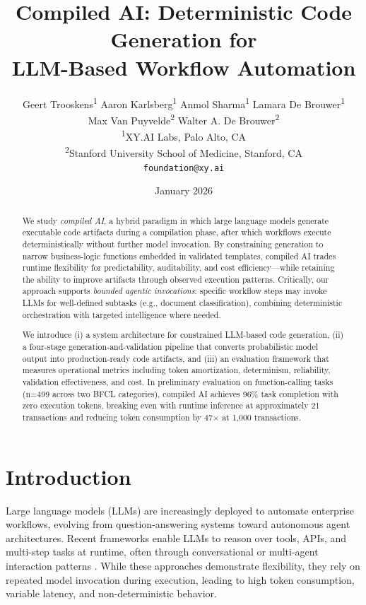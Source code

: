 \documentclass[11pt]{article}
\title{Compiled AI: Deterministic Code Generation for\\LLM-Based Workflow Automation}
\author{
  Geert Trooskens\textsuperscript{1} \quad
  Aaron Karlsberg\textsuperscript{1} \quad
  Anmol Sharma\textsuperscript{1} \quad
  Lamara De Brouwer\textsuperscript{1} \\[0.3em]
  Max Van Puyvelde\textsuperscript{2} \quad
  Walter A. De Brouwer\textsuperscript{2}
  \\[1em]
  \textsuperscript{1}XY.AI Labs, Palo Alto, CA \\
  \textsuperscript{2}Stanford University School of Medicine, Stanford, CA \\[0.5em]
  \texttt{foundation@xy.ai}
}
\date{January 2026}
\begin{document}
\maketitle

\begin{abstract}

We study \emph{compiled AI}, a hybrid paradigm in which large language models generate executable code artifacts during a compilation phase, after which workflows execute deterministically without further model invocation. By constraining generation to narrow business-logic functions embedded in validated templates, compiled AI trades runtime flexibility for predictability, auditability, and cost efficiency---while retaining the ability to improve artifacts through observed execution patterns. Critically, our approach supports \emph{bounded agentic invocations}: specific workflow steps may invoke LLMs for well-defined subtasks (e.g., document classification), combining deterministic orchestration with targeted intelligence where needed.

We introduce (i) a system architecture for constrained LLM-based code generation, (ii) a four-stage generation-and-validation pipeline that converts probabilistic model output into production-ready code artifacts, and (iii) an evaluation framework that measures operational metrics including token amortization, determinism, reliability, validation effectiveness, and cost. In preliminary evaluation on function-calling tasks (n=499 across two BFCL categories), compiled AI achieves 96\% task completion with zero execution tokens, breaking even with runtime inference at approximately 21 transactions and reducing token consumption by 47$\times$ at 1,000 transactions.

\end{abstract}

\section{Introduction}
\label{sec:introduction}

Large language models (LLMs) are increasingly deployed to automate enterprise workflows, evolving from question-answering systems toward autonomous agent architectures. Recent frameworks enable LLMs to reason over tools, APIs, and multi-step tasks at runtime, often through conversational or multi-agent interaction patterns \citep{autogen2024, crewai2024, langchain2022}. While these approaches demonstrate flexibility, they rely on repeated model invocation during execution, leading to high token consumption, variable latency, and non-deterministic behavior.
\end{document}
